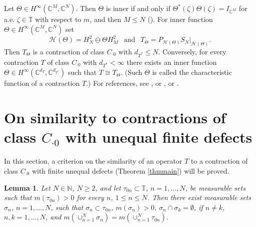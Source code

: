 \documentclass[a4paper,oneside,11pt]{amsart}
\numberwithin{equation}{section}
\theoremstyle{plain}
\newtheorem{lemma}[theorem]{Lemma}
\theoremstyle{definition}
\begin{document}
Let $\Theta\in H^\infty(\mathbb C^M,\mathbb C^N)$. 
Then $\Theta$ is inner if and only if $\Theta^*(\zeta)\Theta(\zeta)=I_{\mathbb C^M}$ for a.e. $\zeta\in\mathbb T$ 
with respect to  $m$, and then $M\leq N$ ({\cite[Proposition V.2.2]{sznfbk}}). For inner function 
 $\Theta\in H^\infty(\mathbb C^M,\mathbb C^N)$ set 
\begin{equation*} \mathcal H(\Theta)=H^2_N\ominus\Theta H^2_M \ \ \text{ and }\ \ 
  T_\Theta = P_{\mathcal H(\Theta)} S_N|_{\mathcal H(\Theta)}.
\end{equation*}
Then $T_\Theta$ is a contraction 
of class $C_{\cdot 0}$ with $d_{T^*}\leq N$. Conversely, for every contraction $T$ of class $C_{\cdot 0}$ with $d_{T^*}<\infty$ 
there exists an inner function $\Theta\in H^\infty(\mathbb C^{d_T},\mathbb C^{d_{T^*}})$ such that $T\cong T_\Theta$. 
(Such $\Theta$ is called the characteristic function of  a contraction $T$.) For references, see  {\cite[Ch. V, VI]{sznfbk}}, or 
{\cite[Sec. V.1]{berc}}, or {\cite[Ch. C.1]{nik02}}. 
 

\section{On similarity to contractions of class $C_{\cdot 0}$ with unequal finite defects}

In this section, a criterion on the similarity of an  operator $T$  to a contraction of 
class $C_{\cdot 0}$ with finite unequal defects (Theorem \ref{thmmain}) will be proved.

\begin{lemma}\label{lemtau} Let $N\in\mathbb N$, $N\geq 2$, and let $\tau_{0n}\subset\mathbb T$, $n=1,\ldots, N$, be  
measurable sets such that $m(\tau_{0n})>0$ for every $n$, $1\leq n \leq N$. Then there exist measurable sets 
$\sigma_n$, $n=1,\ldots, N$, such that $\sigma_n\subset\tau_{0n}$, $m(\sigma_n)>0$, $\sigma_n\cap\sigma_k=\emptyset$, if $n\neq k$, 
$n,k=1, \ldots, N$, and  $m(\cup_{n=1}^N\sigma_n)=m(\cup_{n=1}^N\tau_{0n})$. 
\end{lemma}
\end{document}

